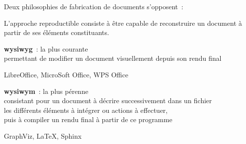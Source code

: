 Deux philosophies de fabrication de documents s’opposent :

L’approche reproductible consiste à être capable de reconstruire un document
à partir de ses éléments constituants.

\begin{itmz}
\item{\textbf{\gls{wysiwyg}} : la plus courante\\
permettant de modifier un document visuellement depuis son rendu final
    \begin{itmz}
    \item{LibreOffice, MicroSoft Office, WPS Office}
    \end{itmz}
}
\item{\textbf{\gls{wysiwym}} : la plus pérenne\\
consistant pour un document à décrire successivement dans un fichier\\
les différents éléments à intégrer ou actions à effectuer,\\
puis à compiler un rendu final à partir de ce programme
    \begin{itmz}
    \item{GraphViz, \LaTeX, Sphinx}
    \end{itmz}
}
\end{itmz}

\pagebreak
